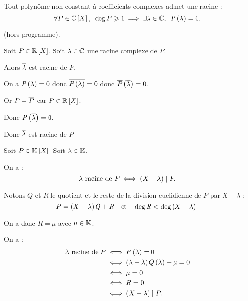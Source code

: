 \begin{theo}
Tout polynôme non-constant à coefficients complexes admet une racine : \[\quantifs{\forall P\in\poly[\C]}\deg P\geq1\imp\quantifs{\exists\lambda\in\C}P\paren{\lambda}=0.\]
\end{theo}

\begin{dem}
 (hors programme).
\end{dem}

\begin{prop}
Soit \(P\in\poly[\R]\). Soit \(\lambda\in\mathbb{C}\) une racine complexe de \(P\).

Alors \(\overline{\lambda}\) est racine de \(P\).
\end{prop}

\begin{dem}
On a \(P\left(\lambda\right)=0\) donc \(\overline{P\left(\lambda\right)}=0\) donc \(\overline{P}\left(\overline{\lambda}\right)=0\).

Or \(P=\overline{P}\) car \(P\in\poly[\R]\).

Donc \(P\left(\overline{\lambda}\right)=0\).

Donc \(\overline{\lambda}\) est racine de \(P\).
\end{dem}

\begin{prop}
Soit \(P\in\poly\). Soit \(\lambda\in\mathbb{K}\).

On a : \[\lambda\text{ racine de }P\iff\left(X-\lambda\right)\mid P.\]
\end{prop}

\begin{dem}
Notons \(Q\) et \(R\) le quotient et le reste de la division euclidienne de \(P\) par \(X-\lambda\) : \[P=\left(X-\lambda\right)Q+R\quad\text{et}\quad\deg R<\deg\left(X-\lambda\right).\]

On a donc \(R=\mu\) avec \(\mu\in\mathbb{K}\).

On a : \[\begin{aligned}
\lambda\text{ racine de }P&\iff P\left(\lambda\right)=0 \\
&\iff\left(\lambda-\lambda\right)Q\left(\lambda\right)+\mu=0 \\
&\iff\mu=0 \\
&\iff R=0 \\
&\iff\left(X-\lambda\right)\mid P.
\end{aligned}\]
\end{dem}

